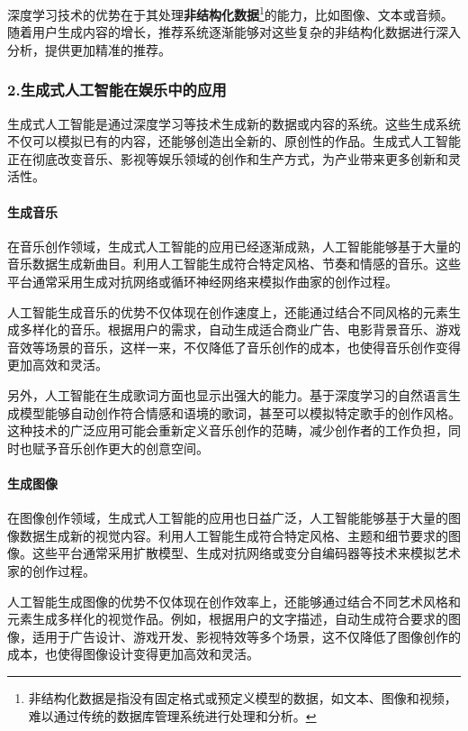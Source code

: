 深度学习技术的优势在于其处理\textbf{非结构化数据}\footnote{非结构化数据是指没有固定格式或预定义模型的数据，如文本、图像和视频，难以通过传统的数据库管理系统进行处理和分析。}的能力，比如图像、文本或音频。随着用户生成内容的增长，推荐系统逐渐能够对这些复杂的非结构化数据进行深入分析，提供更加精准的推荐。

\subsubsection{2.生成式人工智能在娱乐中的应用}

生成式人工智能是通过深度学习等技术生成新的数据或内容的系统。这些生成系统不仅可以模拟已有的内容，还能够创造出全新的、原创性的作品。生成式人工智能正在彻底改变音乐、影视等娱乐领域的创作和生产方式，为产业带来更多创新和灵活性。

\paragraph{生成音乐}

在音乐创作领域，生成式人工智能的应用已经逐渐成熟，人工智能能够基于大量的音乐数据生成新曲目。利用人工智能生成符合特定风格、节奏和情感的音乐。这些平台通常采用生成对抗网络或循环神经网络来模拟作曲家的创作过程。

人工智能生成音乐的优势不仅体现在创作速度上，还能通过结合不同风格的元素生成多样化的音乐。根据用户的需求，自动生成适合商业广告、电影背景音乐、游戏音效等场景的音乐，这样一来，不仅降低了音乐创作的成本，也使得音乐创作变得更加高效和灵活。

另外，人工智能在生成歌词方面也显示出强大的能力。基于深度学习的自然语言生成模型能够自动创作符合情感和语境的歌词，甚至可以模拟特定歌手的创作风格。这种技术的广泛应用可能会重新定义音乐创作的范畴，减少创作者的工作负担，同时也赋予音乐创作更大的创意空间。

\paragraph{生成图像}

在图像创作领域，生成式人工智能的应用也日益广泛，人工智能能够基于大量的图像数据生成新的视觉内容。利用人工智能生成符合特定风格、主题和细节要求的图像。这些平台通常采用扩散模型、生成对抗网络或变分自编码器等技术来模拟艺术家的创作过程。

人工智能生成图像的优势不仅体现在创作效率上，还能够通过结合不同艺术风格和元素生成多样化的视觉作品。例如，根据用户的文字描述，自动生成符合要求的图像，适用于广告设计、游戏开发、影视特效等多个场景，这不仅降低了图像创作的成本，也使得图像设计变得更加高效和灵活。

